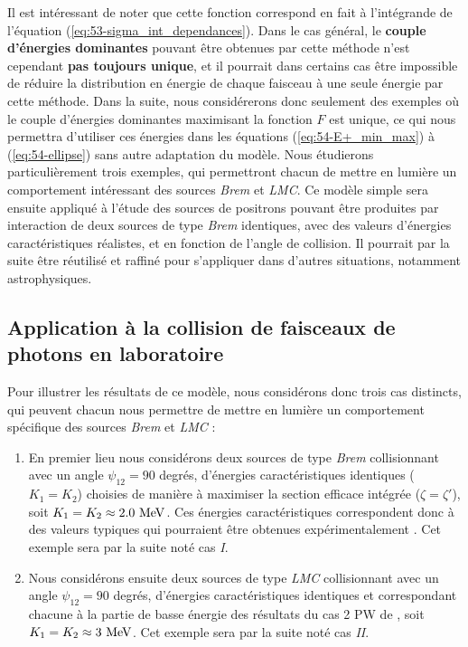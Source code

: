 \begin{refsection}
Il est intéressant de noter que cette fonction correspond en fait à l'intégrande de l'équation (\ref{eq:53-sigma_int_dependances}). Dans le cas général, le \textbf{couple d'énergies dominantes} pouvant être obtenues par cette méthode n'est cependant \textbf{pas toujours unique}, et il pourrait dans certains cas être impossible de réduire la distribution en énergie de chaque faisceau à une seule énergie par cette méthode. Dans la suite, nous considérerons donc seulement des exemples où le couple d'énergies dominantes maximisant la fonction $F$ est unique, ce qui nous permettra d'utiliser ces énergies dans les équations (\ref{eq:54-E+_min_max}) à (\ref{eq:54-ellipse}) sans autre adaptation du modèle. Nous étudierons particulièrement trois exemples, qui permettront chacun de mettre en lumière un comportement intéressant des sources \textit{Brem} et \textit{LMC}. Ce modèle simple sera ensuite appliqué à l'étude des sources de positrons pouvant être produites par interaction de deux sources de type \textit{Brem} identiques, avec des valeurs d'énergies caractéristiques réalistes, et en fonction de l'angle de collision. Il pourrait par la suite être réutilisé et raffiné pour s'appliquer dans d'autres situations, notamment astrophysiques.


\subsection{Application à la collision de faisceaux de photons en laboratoire}

Pour illustrer les résultats de ce modèle, nous considérons donc trois cas distincts, qui peuvent chacun nous permettre de mettre en lumière un comportement spécifique des sources \textit{Brem} et \textit{LMC} :
\begin{enumerate}[label={\Roman*. }]
    \item En premier lieu nous considérons deux sources de type \textit{Brem} collisionnant avec un angle $\psi_{12}=90$ degrés, d'énergies caractéristiques identiques ($K_1=K_2$) choisies de manière à maximiser la section efficace intégrée ($\zeta=\zeta'$), soit $K_1=K_2 \approx 2.0 ~ \rm MeV$. Ces énergies caractéristiques correspondent donc à des valeurs typiques qui pourraient être obtenues expérimentalement \parencite{norreys_1999, henderson_2014}. Cet exemple sera par la suite noté cas \textit{I}.
    
    \item Nous considérons ensuite deux sources de type \textit{LMC} collisionnant avec un angle $\psi_{12}=90$ degrés, d'énergies caractéristiques identiques et correspondant chacune à la partie de basse énergie des résultats du cas 2 PW de \cite{wang_2020}, soit $K_1=K_2 \approx 3 ~ \rm MeV$. Cet exemple sera par la suite noté cas \textit{II}.
    

\end{enumerate}
\end{refsection}
